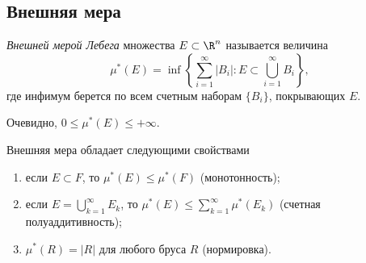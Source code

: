\subsection{Внешняя мера}

\begin{definition}
    \textit{Внешней мерой Лебега} множества $E \subset \R^{n}$ называется величина
    \[\mu^{*}(E) = \inf\left\{\sum_{i = 1}^{\infty}|B_{i}|: E \subset \bigcup_{i = 1}^{\infty}B_{i}\right\},\]
    где инфимум берется по всем счетным наборам $\{B_{i}\}$, покрывающих $E$.

    Очевидно, $0 \leq \mu^{*}(E) \leq +\infty$.
\end{definition}

\begin{theorem}
    Внешняя мера обладает следующими свойствами
    \begin{enumerate}
        \item если $E \subset F$, то $\mu^{*}(E) \leq \mu^{*}(F)$ (монотонность);
        \item если $E = \bigcup_{k = 1}^{\infty} E_{k}$, то $\mu^{*}(E) \leq \sum_{k = 1}^{\infty}\mu^{*}(E_{k})$ (счетная полуаддитивность);
        \item $\mu^{*}(R) = |R|$ для любого бруса $R$ (нормировка).
    \end{enumerate}
\end{theorem}

